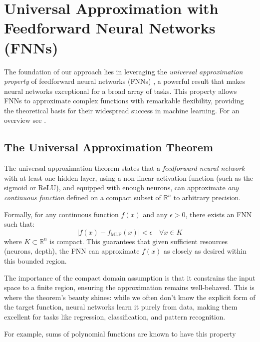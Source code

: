 \documentclass{article}
\theoremstyle{definition}
\theoremstyle{remark}
\newcounter{ct}
\begin{document}
\newpage
\appendix 

\section{Universal Approximation with Feedforward Neural Networks (FNNs)}\label{sec:uniapproxffn}

The foundation of our approach lies in leveraging the \textit{universal approximation property} of feedforward neural networks (FNNs) \citep{poggio1990networks}, a powerful result that makes neural networks exceptional for a broad array of tasks. This property allows FNNs to approximate complex functions with remarkable flexibility, providing the theoretical basis for their widespread success in machine learning.
For an overview see \citep{blum1991approximation,scarselli1998universal,augustine2024survey}.





\subsection{The Universal Approximation Theorem}
The universal approximation theorem states that a \textit{feedforward neural network} with at least one hidden layer, using a non-linear activation function (such as the sigmoid or ReLU), and equipped with enough neurons, can approximate \textit{any continuous function} defined on a compact subset of \(\mathbb{R}^n\) to arbitrary precision.

Formally, for any continuous function \(f(x)\) and any \(\epsilon > 0\), there exists an FNN such that:
\[
| f(x) - f_{\text{MLP}}(x) | < \epsilon \quad \forall x \in K
\]
where \(K \subset \mathbb{R}^n\) is compact. This guarantees that given sufficient resources (neurons, depth), the FNN can approximate \(f(x)\) as closely as desired within this bounded region.

The importance of the compact domain assumption is that it constrains the input space to a finite region, ensuring the approximation remains well-behaved.	
This is where the theorem’s beauty shines: while we often don’t know the explicit form of the target function, neural networks learn it purely from data, making them excellent for tasks like regression, classification, and pattern recognition.

 For example, sums of polynomial functions are known to have this property\citep{llavona1986approximation}
\end{document}
